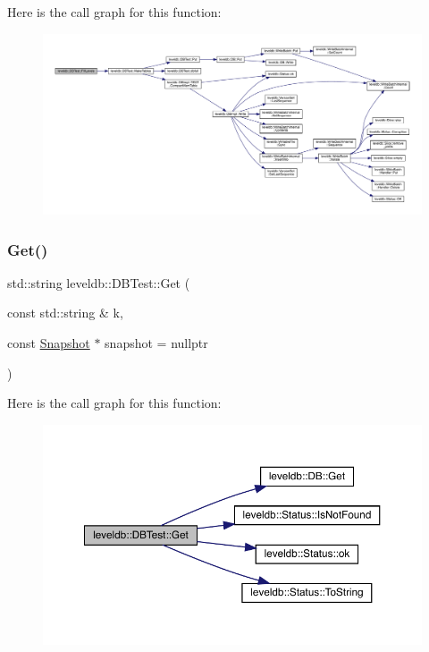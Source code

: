 Here is the call graph for this function\+:
\nopagebreak
\begin{figure}[H]
\begin{center}
\leavevmode
\includegraphics[width=350pt]{classleveldb_1_1_d_b_test_ac291d06db907f5fee7caf04f44f65493_cgraph}
\end{center}
\end{figure}
\mbox{\label{classleveldb_1_1_d_b_test_a99cd7b06d51f5c854da152a6419bff5c}} 
\subsubsection{\texorpdfstring{Get()}{Get()}}
{\footnotesize\ttfamily std\+::string leveldb\+::\+D\+B\+Test\+::\+Get (\begin{DoxyParamCaption}\item[{const std\+::string \&}]{k,  }\item[{const \mbox{\hyperlink{classleveldb_1_1_snapshot}{Snapshot}} $\ast$}]{snapshot = {\ttfamily nullptr} }\end{DoxyParamCaption})\hspace{0.3cm}{\ttfamily [inline]}}

Here is the call graph for this function\+:
\nopagebreak
\begin{figure}[H]
\begin{center}
\leavevmode
\includegraphics[width=350pt]{classleveldb_1_1_d_b_test_a99cd7b06d51f5c854da152a6419bff5c_cgraph}
\end{center}
\end{figure}
\mbox{\label{classleveldb_1_1_d_b_test_ad162fa0f5a31e61ee94ba9f45af716f8}} 
